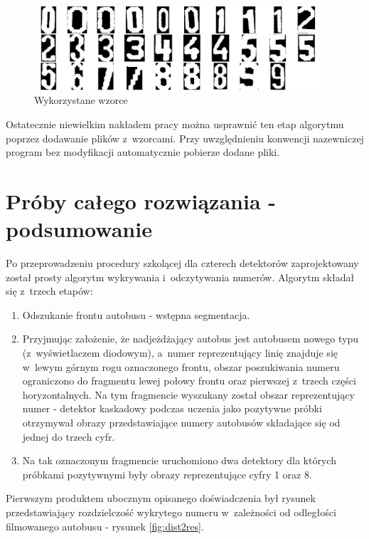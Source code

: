 \begin{figure}[!h]
    \centering
    \includegraphics[width=0.95\textwidth]{img/exp_templates_used}
    \caption{Wykorzystane wzorce}
    \label{fig:used_templates}
\end{figure}

Ostatecznie niewielkim nakładem pracy można usprawnić ten etap
algorytmu poprzez dodawanie plików z~wzorcami. Przy uwzględnieniu 
konwencji nazewniczej program bez modyfikacji automatycznie
pobierze dodane pliki.

\section{Próby całego rozwiązania - podsumowanie}

Po przeprowadzeniu procedury szkolącej dla czterech detektorów
zaprojektowany został prosty algorytm wykrywania i~odczytywania numerów.
Algorytm składał się z~trzech etapów:

\begin{enumerate}
    \item Odszukanie frontu autobusu - wstępna segmentacja.
    \item Przyjmując założenie, że nadjeżdżający autobus jest autobusem
        nowego typu (z~wyświetlaczem diodowym), a~numer reprezentujący
        linię znajduje się w~lewym górnym rogu oznaczonego frontu,
        obszar poszukiwania numeru ograniczono do fragmentu lewej połowy
        frontu oraz pierwszej z~trzech części horyzontalnych. Na tym 
        fragmencie wyszukany został obszar reprezentujący numer -
        detektor kaskadowy podczas uczenia jako pozytywne próbki
        otrzymywał obrazy przedstawiające numery autobusów składające
        się od jednej do trzech cyfr.
    \item Na tak oznaczonym fragmencie uruchomiono dwa detektory
        dla których próbkami pozytywnymi były obrazy reprezentujące
        cyfry 1 oraz 8.
\end{enumerate}

Pierwszym produktem ubocznym opisanego doświadczenia był rysunek
przedstawiający rozdzielczość wykrytego numeru w~zależności
od odległości filmowanego autobusu - rysunek \ref{fig:dist2res}.

